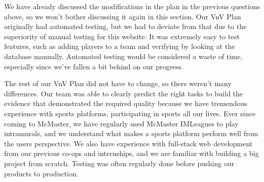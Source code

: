 \documentclass[12pt, titlepage]{article}
\begin{document}
\begin{enumerate}
  We have already discussed the modifications in the plan in the previous questions above, so we won't bother discussing it again in this section. Our VnV Plan originally had automated testing, but we had to deviate from that due to the superiority of manual testing for this website. It was extremely easy to test features, such as adding players to a team and verifying by looking at the database manually. Automated testing would be considered a waste of time, especially since we've fallen a bit behind on our progress.

  The rest of our VnV Plan did not have to change, so there weren't many differences. Our team was able to clearly predict the right tasks to build the evidence that demonstrated the required quality because we have tremendous experience with sports platforms, participating in sports all our lives. Ever since coming to McMaster, we have regularly used McMaster IMLeagues to play intramurals, and we understand what makes a sports platform perform well from the users perspective. We also have experience with full-stack web development from our previous co-ops and internships, and we are familiar with building a big project from scratch. Testing was often regularly done before pushing our products to production.
  
\end{enumerate}
\end{document}
